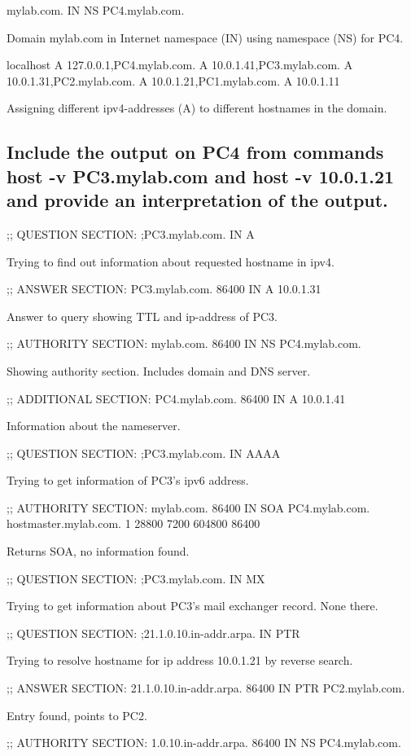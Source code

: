 \documentclass[a4paper, 11pt]{article}
\begin{document}
mylab.com.	IN	NS	PC4.mylab.com.

Domain mylab.com in Internet namespace (IN) using namespace (NS) for PC4.

localhost	A	127.0.0.1,PC4.mylab.com.	A	10.0.1.41,PC3.mylab.com.	A	10.0.1.31,PC2.mylab.com.	A	10.0.1.21,PC1.mylab.com.	A	10.0.1.11

Assigning different ipv4-addresses (A) to different hostnames in the domain.

\subsection {Include the output on PC4 from commands host -v PC3.mylab.com and host -v 10.0.1.21 and provide an interpretation of the output. }

;; QUESTION SECTION: ;PC3.mylab.com.			IN	A

Trying to find out information about requested hostname in ipv4.

;; ANSWER SECTION: PC3.mylab.com.		86400	IN	A	10.0.1.31

Answer to query showing TTL and ip-address of PC3.

;; AUTHORITY SECTION: mylab.com.		86400	IN	NS	PC4.mylab.com.

Showing authority section. Includes domain and DNS server.

;; ADDITIONAL SECTION: PC4.mylab.com.		86400	IN	A	10.0.1.41

Information about the nameserver.

;; QUESTION SECTION: ;PC3.mylab.com.			IN	AAAA

Trying to get information of PC3's ipv6 address.

;; AUTHORITY SECTION: mylab.com.		86400	IN	SOA	PC4.mylab.com. hostmaster.mylab.com. 1 28800 7200 604800 86400

Returns SOA, no information found.

;; QUESTION SECTION: ;PC3.mylab.com.			IN	MX

Trying to get information about PC3's mail exchanger record. None there.

;; QUESTION SECTION: ;21.1.0.10.in-addr.arpa.		IN	PTR

Trying to resolve hostname for ip address 10.0.1.21 by reverse search.

;; ANSWER SECTION: 21.1.0.10.in-addr.arpa.	86400	IN	PTR	PC2.mylab.com.

Entry found, points to PC2.

;; AUTHORITY SECTION: 1.0.10.in-addr.arpa.	86400	IN	NS	PC4.mylab.com.
\end{document}
